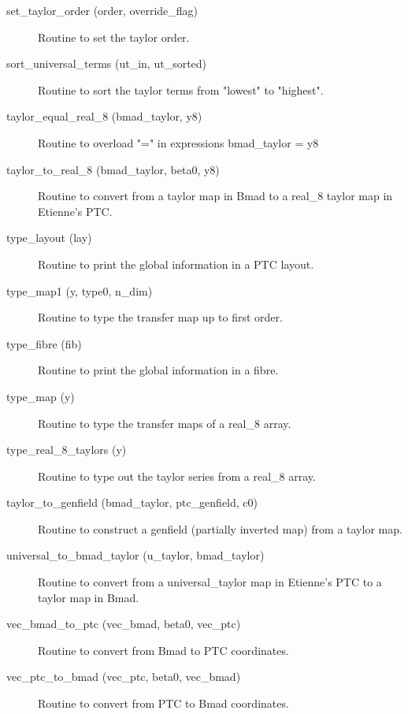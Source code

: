 \begin{description}
\item[set_taylor_order (order, override_flag)] \Newline
Routine to set the taylor order. 

\label{r:sort.universal.terms}
\item[sort_universal_terms (ut_in, ut_sorted)] \Newline
Routine to sort the taylor terms from "lowest" to "highest". 

\label{r:taylor.equal.real.8}
\item[taylor_equal_real_8 (bmad_taylor, y8)] \Newline
Routine to overload "=" in expressions bmad_taylor = y8 

\label{r:taylor.to.real.8}
\item[taylor_to_real_8 (bmad_taylor, beta0, y8)] \Newline
Routine to convert from a taylor map in Bmad to a real_8 taylor map in Etienne's PTC. 

\label{r:type.layout}
\item[type_layout (lay)] \Newline
Routine to print the global information in a PTC layout.

\label{r:type.map1}
\item[type_map1 (y, type0, n_dim)] \Newline
Routine to type the transfer map up to first order. 

\label{r:type.fibre}
\item[type_fibre (fib)] \Newline
Routine to print the global information in a fibre.

\label{r:type.map}
\item[type_map (y)] \Newline
Routine to type the transfer maps of a real_8 array. 

\label{r:type.real.8.taylors}
\item[type_real_8_taylors (y)] \Newline
Routine to type out the taylor series from a real_8 array. 

\label{r:taylor.to.genfield}
\item[taylor_to_genfield (bmad_taylor, ptc_genfield, c0)] \Newline
Routine to construct a genfield (partially inverted map) from a taylor map. 

\label{r:universal.to.bmad.taylor}
\item[universal_to_bmad_taylor (u_taylor, bmad_taylor)] \Newline
Routine to convert from a universal_taylor map in Etienne's PTC to a taylor map in Bmad. 

\label{r:vec.bmad.to.ptc}
\item[vec_bmad_to_ptc (vec_bmad, beta0, vec_ptc)] \Newline
Routine to convert from Bmad to PTC coordinates. 

\label{r:vec.ptc.to.bmad}
\item[vec_ptc_to_bmad (vec_ptc, beta0, vec_bmad)] \Newline
Routine to convert from PTC to Bmad coordinates. 

\end{description}

